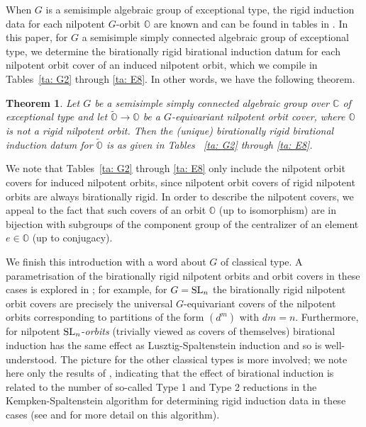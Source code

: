 \documentclass[11pt]{amsart}
\newcommand{\C}{{\mathbb C}}
\renewcommand{\O}{{\mathbb O}}
\newcommand{\SL}{{{\mbox{\rm SL}}}}
\newcommand{\covO}{\widetilde{\O}}
\newtheorem{theorem}{Theorem}[section]
\numberwithin{equation}{section}
\begin{document}
	When $G$ is a semisimple algebraic group of exceptional type, the rigid induction data for each nilpotent $G$-orbit $\O$ are known and can be found in tables in \cite{El,EdG}. In this paper, for $G$ a semisimple simply connected algebraic group of exceptional type, we determine the birationally rigid birational induction datum for each nilpotent orbit cover of an induced nilpotent orbit, which we compile in Tables~\ref{ta: G2} through \ref{ta: E8}. In other words, we have the following theorem.
	\begin{theorem}
		Let $G$ be a semisimple simply connected algebraic group over $\C$ of exceptional type and let $\covO\to \O$ be a $G$-equivariant nilpotent orbit cover, where $\O$ is not a rigid nilpotent orbit. Then the (unique) birationally rigid birational induction datum for $\covO$ is as given in Tables ~\ref{ta: G2} through \ref{ta: E8}.
	\end{theorem}
	We note that Tables~\ref{ta: G2} through \ref{ta: E8} only include the nilpotent orbit covers for induced nilpotent orbits, since nilpotent orbit covers of rigid nilpotent orbits are always birationally rigid. In order to describe the nilpotent covers, we appeal to the fact that such covers of an orbit $\O$ (up to isomorphism) are in bijection with subgroups of the component group of the centralizer of an element $e\in\O$ (up to conjugacy). 
	
	We finish this introduction with a word about $G$ of classical type. A parametrisation of the birationally rigid nilpotent orbits and orbit covers in these cases is explored in \cite[\S\S 7.6.1--7.6.2]{LMM}; for example, for $G=\SL_n$ the birationally rigid nilpotent orbit covers are precisely the universal $G$-equivariant covers of the nilpotent orbits corresponding to partitions of the form $(d^m)$ with $dm=n$. Furthermore, for nilpotent $\SL_n$-{\em orbits} (trivially viewed as covers of themselves) birational induction has the same effect as Lusztig-Spaltenstein induction and so is well-understood. The picture for the other classical types is more involved; we note here only the results of \cite{Nam22}, indicating that the effect of birational induction is related to the number of so-called Type 1 and Type 2 reductions in the Kempken-Spaltenstein algorithm for determining rigid induction data in these cases (see \cite{PT} and \cite{GTW} for more detail on this algorithm).
	
\end{document}
